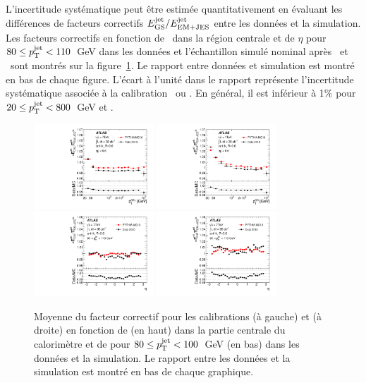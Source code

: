 L'incertitude systématique peut être estimée quantitativement en évaluant les différences de facteurs correctifs $E_{{\rm GS}}^{\rm jet}/E_{{\rm EM+JES}}^{\rm jet}$ entre les données et la simulation. 
Les facteurs correctifs en fonction de \ptjet~dans la région centrale et de $\eta$ pour $80 \le p_{\mathrm{T}}^\mathrm{jet} < 110$~GeV dans les données et l'échantillon simulé nominal après \GSL~et \GS~sont montrés sur la figure~\ref{fig:EcalEem}. 
Le rapport entre données et simulation est montré en bas de chaque figure. 
L'écart à l'unité dans le rapport représente l'incertitude systématique associée à la calibration \GSL~ou \GS. En général, il est inférieur à 1\% pour $20 \le p_{\mathrm{T}}^\mathrm{jet} < 800$~GeV et .


\begin{figure}[ht!]
\centering
\includegraphics[width=0.4\textwidth]{figures/fig_51a.pdf}
\hspace{1.cm}
\includegraphics[width=0.4\textwidth]{figures/fig_51b.pdf}\\
\includegraphics[width=0.4\textwidth]{figures/fig_51c.pdf}
\hspace{1.cm}
\includegraphics[width=0.4\textwidth]{figures/fig_51d.pdf}
\caption{Moyenne du facteur correctif pour les calibrations \GSL{} (\`a gauche) et \GS{} (\`a droite) en fonction de \ptjet{} (en haut) dans la partie centrale du calorim\`etre et de \eta{} pour $80 \le p_{\mathrm{T}}^\mathrm{jet} < 100$~GeV (en bas) dans les donn\'ees et la simulation. Le rapport entre les donn\'ees et la simulation est montr\'e en bas de chaque graphique.}
\label{fig:EcalEem}
\end{figure}

